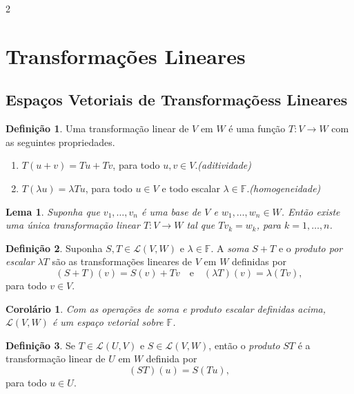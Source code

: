 \documentclass{article}
\theoremstyle{plain}
\newtheorem{lem}[thm]{Lema}
\newtheorem{cor}[thm]{Corolário}
\theoremstyle{definition}
\newtheorem{defn}{Definição}[section]
\theoremstyle{remark}
\begin{document}
\begin{multicols}{2}
\section{Transformações Lineares}

\subsection{Espaços Vetoriais de Transformaçõess Lineares}
\begin{defn}
    Uma transformação linear de \(V\) em \(W\) é uma função \(T: V \to W\) com as seguintes propriedades.
    \begin{enumerate}
        \item \(T(u + v) = Tu + Tv\), para todo \(u, v \in V\).\hfill\emph{(aditividade)}
        \item \(T(\lambda u) = \lambda Tu\), para todo \(u \in V\) e todo escalar \(\lambda \in \mathbb{F}\).\hfill\emph{(homogeneidade)}
    \end{enumerate}
\end{defn}

\begin{lem}
    Suponha que \(v_1,\ldots,v_n\) é uma base de \(V\) e \(w_1,\ldots,w_n \in W\). Então existe uma única transformação linear \(T: V \to W\) tal que \(Tv_k = w_k\), para \(k = 1, \ldots, n\).
\end{lem}

\begin{defn}
    Suponha \(S, T \in \mathcal{L}(V, W)\) e \(\lambda \in \mathbb{F}\). A \emph{soma} \(S + T\) e o \emph{produto por escalar} \(\lambda T\) são as transformações lineares de \(V\) em \(W\) definidas por
    \[
        (S + T)(v) = S(v) + Tv \quad \text{e} \quad (\lambda T)(v) = \lambda (Tv),
    \]
    \noindent para todo \(v \in V\).
\end{defn}

\begin{cor}
    Com as operações de soma e produto escalar definidas acima, \(\mathcal{L}(V, W)\) é um espaço vetorial sobre \(\mathbb{F}\).
\end{cor}

\begin{defn}
    Se \(T \in \mathcal{L}(U, V)\) e \(S \in \mathcal{L}(V, W)\), então o \emph{produto} \(ST\) é a transformação linear de \(U\) em \(W\) definida por
    \[
        (ST)(u) = S(Tu),
    \]
    \noindent para todo \(u \in U\).
\end{defn}


\end{multicols}
\end{document}
